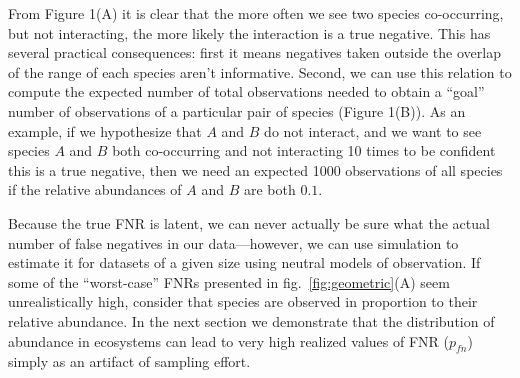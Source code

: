 \documentclass[10pt,oneside]{article}
\begin{document}
From Figure 1(A) it is clear that the more often we see two species
co-occurring, but not interacting, the more likely the interaction is a
true negative. This has several practical consequences: first it means
negatives taken outside the overlap of the range of each species aren't
informative. Second, we can use this relation to compute the expected
number of total observations needed to obtain a ``goal'' number of
observations of a particular pair of species (Figure 1(B)). As an
example, if we hypothesize that \(A\) and \(B\) do not interact, and we
want to see species \(A\) and \(B\) both co-occurring and not
interacting 10 times to be confident this is a true negative, then we
need an expected 1000 observations of all species if the relative
abundances of \(A\) and \(B\) are both \(0.1\).

Because the true FNR is latent, we can never actually be sure what the
actual number of false negatives in our data---however, we can use
simulation to estimate it for datasets of a given size using neutral
models of observation. If some of the ``worst-case'' FNRs presented in
fig.~\ref{fig:geometric}(A) seem unrealistically high, consider that
species are observed in proportion to their relative abundance. In the
next section we demonstrate that the distribution of abundance in
ecosystems can lead to very high realized values of FNR (\(p_{fn}\))
simply as an artifact of sampling effort.
\end{document}
